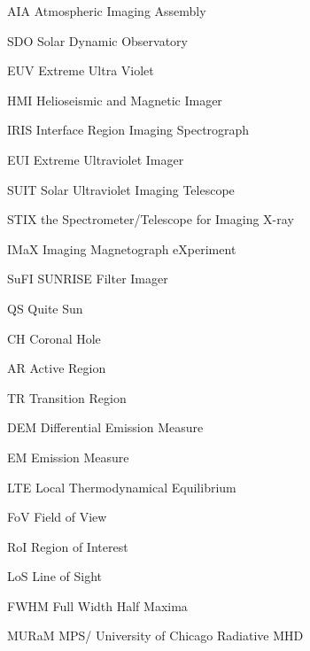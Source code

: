 \begin{abbrv}

\item[AIA]  Atmospheric Imaging Assembly
\item[SDO]  Solar Dynamic Observatory
\item[EUV]  Extreme Ultra Violet
\item[HMI]  Helioseismic and Magnetic Imager 
\item[IRIS] Interface Region Imaging Spectrograph 
\item[EUI]  Extreme Ultraviolet Imager
\item[SUIT] Solar Ultraviolet Imaging Telescope
\item[STIX] the Spectrometer/Telescope for Imaging X-ray 
\item[IMaX] Imaging Magnetograph eXperiment
\item[SuFI] SUNRISE Filter Imager
\item[QS]   Quite Sun
\item[CH]   Coronal Hole
\item[AR]   Active Region
\item[TR]   Transition Region
\item[DEM]  Differential Emission Measure
\item[EM]   Emission Measure
\item[LTE]  Local Thermodynamical Equilibrium 
\item[FoV]  Field of View
\item[RoI]  Region of Interest 
\item[LoS]  Line of Sight
\item[FWHM] Full Width Half Maxima
\item[MURaM] MPS/ University of Chicago Radiative MHD 

\end{abbrv}